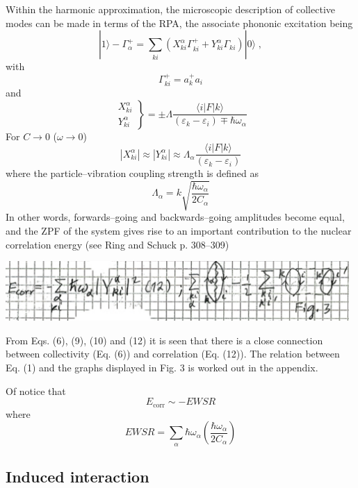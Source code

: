 \documentclass[a4paper,onecolumn,superscriptaddress,12pt,nofootinbib,twoside,raggedfooter,notitlepage]{revtex4-1}
\begin{document}
Within the harmonic approximation, the microscopic description of collective modes can be made in terms of the RPA, the associate phononic excitation being
\begin{equation}
	|1 \rangle - \Gamma_\alpha^+ = \sum_{ki} \left( X_{ki}^\alpha \Gamma_{ki}^+ + Y_{ki}^\alpha \Gamma_{ki} \right) |0 \rangle \;,
\end{equation}
with
\begin{equation}
	\Gamma_{ki}^+ = a_k^+ a_i
\end{equation}
and
\begin{equation}
	\left. \begin{array}{l} X_{ki}^\alpha \\ Y_{ki}^\alpha \end{array} \right\} = \pm \Lambda \frac{\langle i|F|k \rangle}{(\varepsilon_k - \varepsilon_i) \mp \hbar \omega_\alpha}
\end{equation}
For $C \rightarrow 0$ ($\omega \rightarrow 0$)
\begin{equation}
	|X_{ki}^\alpha| \approx |Y_{ki}^\alpha| \approx \Lambda_\alpha \frac{\langle i|F|k \rangle}{(\varepsilon_k - \varepsilon_i)}
\end{equation}
where the particle--vibration coupling strength is defined as
\begin{equation}
	\Lambda_\alpha = k \sqrt{\frac{\hbar\omega_\alpha}{2C_\alpha}}
\end{equation}
In other words, forwards--going and backwards--going amplitudes become equal, and the ZPF of the system gives rise to an important contribution to the nuclear correlation energy (see Ring and Schuck p. 308--309)
\begin{center}
	\includegraphics[width=0.98\textwidth]{figs/fig_a3}
\end{center}
From Eqs. (6), (9), (10) and (12) it is seen that there is a close connection between collectivity (Eq. (6)) and correlation (Eq. (12)). The relation between Eq. (1) and the graphs displayed in Fig. 3 is worked out in the appendix.

Of notice that
$$ E_\textrm{corr} \sim -EWSR$$
where
$$ EWSR = \sum_\alpha \hbar \omega_\alpha \left( \frac{\hbar \omega_\alpha}{2C_\alpha}\right) $$

\subsection{Induced interaction}
\end{document}
